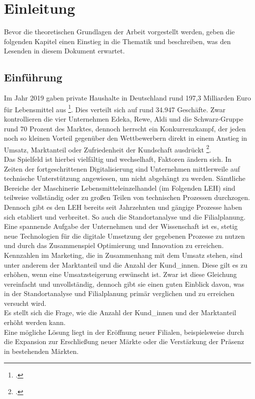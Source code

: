 \chapter{Einleitung}
Bevor die theoretischen Grundlagen der Arbeit vorgestellt werden, geben die folgenden Kapitel einen Einstieg in die Thematik und beschreiben, was den Lesenden in diesem Dokument erwartet.

\section{Einführung}
Im Jahr 2019 gaben private Haushalte in Deutschland rund 197,3 Milliarden Euro für Lebensmittel aus \footcite{statista_konsumausgaben}.
Dies verteilt sich auf rund 34.947 Geschäfte.
Zwar kontrollieren die vier Unternehmen Edeka, Rewe, Aldi und die Schwarz-Gruppe rund 70 Prozent des Marktes, dennoch herrscht ein Konkurrenzkampf, der jeden noch so kleinen Vorteil gegenüber den Wettbewerbern direkt in einem Anstieg in Umsatz, Marktanteil oder Zufriedenheit der Kundschaft ausdrückt \footcite{statista_lebensmittel-discounter}.\\
Das Spielfeld ist hierbei vielfältig und wechselhaft, Faktoren ändern sich. 
In Zeiten der fortgeschrittenen Digitalisierung sind Unternehmen mittlerweile auf technische Unterstützung angewiesen, um nicht abgehängt zu werden. 
Sämtliche Bereiche der Maschinerie Lebensmitteleinzelhandel (im Folgenden LEH) sind teilweise vollständig oder zu großen Teilen von technischen Prozessen durchzogen.
Dennoch gibt es den LEH bereits seit Jahrzehnten und gängige Prozesse haben sich etabliert und verbreitet. 
So auch die Standortanalyse und die Filialplanung. 
Eine spannende Aufgabe der Unternehmen und der Wissenschaft ist es, stetig neue Technologien für die digitale Umsetzung der gegebenen Prozesse zu nutzen und durch das Zusammenspiel Optimierung und Innovation zu erreichen. \\
Kennzahlen im Marketing, die in Zusammenhang mit dem Umsatz stehen, sind unter anderem der Marktanteil und die Anzahl der Kund\_innen.
Diese gilt es zu erhöhen, wenn eine Umsatzsteigerung erwünscht ist. 
Zwar ist diese Gleichung vereinfacht und unvollständig, dennoch gibt sie einen guten Einblick davon, was in der Standortanalyse und Filialplanung primär verglichen und zu erreichen versucht wird.\\
Es stellt sich die Frage, wie die Anzahl der Kund\_innen und der Marktanteil erhöht werden kann.\\
Eine mögliche Lösung liegt in der Eröffnung neuer Filialen, beispielsweise durch die Expansion zur Erschließung neuer Märkte oder die Verstärkung der Präsenz in bestehenden Märkten.
